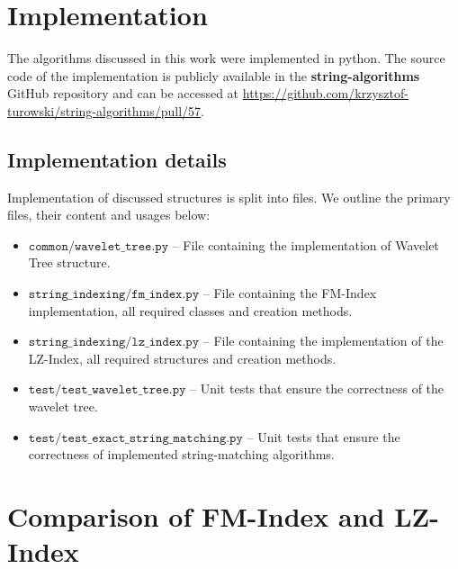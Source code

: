 \section{Implementation}
The algorithms discussed in this work were implemented in python. The source code of the implementation is publicly available in the \textbf{string-algorithms} GitHub repository and can be accessed at \url{https://github.com/krzysztof-turowski/string-algorithms/pull/57}. 

\subsection{Implementation details}
Implementation of discussed structures is split into files. We outline the primary files, their content and usages below:
\begin{itemize}
    \item $\texttt{common/wavelet\_tree.py}$ -- File containing the implementation of Wavelet Tree structure.
    \item $\texttt{string\_indexing/fm\_index.py}$ -- File containing the FM-Index implementation, all required classes and creation methods.
    \item $\texttt{string\_indexing/lz\_index.py}$ --  File containing the implementation of the LZ-Index, all required structures and creation methods.
    \item $\texttt{test/test\_wavelet\_tree.py}$ -- Unit tests that ensure the correctness of the wavelet tree.
    \item $\texttt{test/test\_exact\_string\_matching.py}$ -- Unit tests that ensure the correctness of implemented string-matching algorithms.
\end{itemize}

\section{Comparison of FM-Index and LZ-Index}

